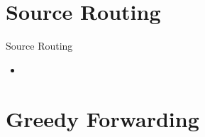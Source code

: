 \documentclass[pdftex]{beamer}
\begin{document}

\section{Source Routing}

\begin{frame}{Source Routing}
	\begin{itemize}
		\item 
	\end{itemize}
\end{frame}


\section{Greedy Forwarding}
\end{document}
